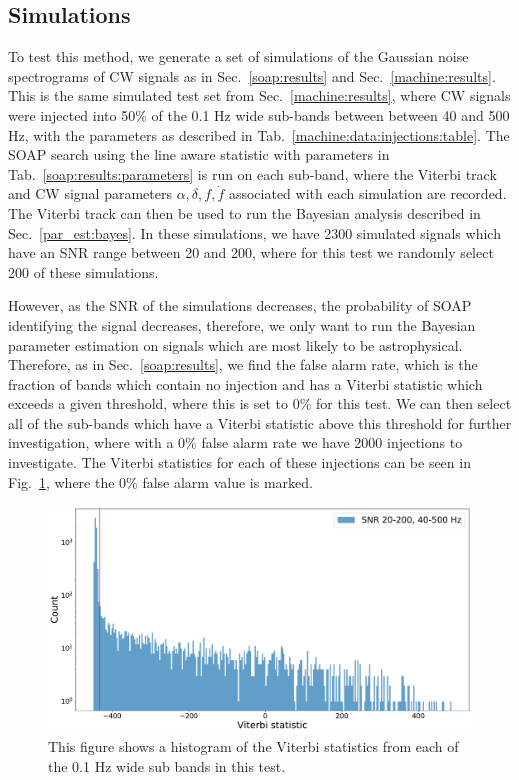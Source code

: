 \subsection{\label{par_est:results:simulations}Simulations}
%
%
To test this method, we generate a set of simulations of the Gaussian noise spectrograms of \gls{CW} signals as in Sec.~\ref{soap:results} and Sec.~\ref{machine:results}.
This is the same simulated test set from Sec.~\ref{machine:results}, where \gls{CW} signals were injected into 50\% of the 0.1 Hz wide sub-bands between between 40 and 500 Hz, with the parameters as described in Tab.~\ref{machine:data:injections:table}. 
The SOAP search using the line aware statistic with parameters in Tab.~\ref{soap:results:parameters}  is run on each sub-band, where the Viterbi track and \gls{CW} signal parameters $\alpha, \delta, f, \dot{f}$ associated with each simulation are recorded.
The Viterbi track can then be used to run the Bayesian analysis described in Sec.~\ref{par_est:bayes}.
In these simulations, we have 2300 simulated signals which have an \gls{SNR} range between 20 and 200, where for this test we randomly select 200 of these simulations.

\if
However, as the \gls{SNR} of the simulations decreases, the probability of SOAP identifying the signal decreases, therefore, we only want to run the Bayesian parameter estimation on signals which are most likely to be astrophysical.
Therefore, as in Sec.~\ref{soap:results}, we find the false alarm rate, which is the fraction of bands which contain no injection and has a Viterbi statistic which exceeds a given threshold, where this is set to 0\% for this test.
We can then select all of the sub-bands which have a Viterbi statistic above this threshold for further investigation, where with a 0\% false alarm rate we have 2000  injections to investigate.
The Viterbi statistics for each of these injections can be seen in Fig.~\ref{par_est:results:all_viterbi}, where the 0\% false alarm value is marked.
%
\begin{figure}
    \centering
    \includegraphics[width=\linewidth]{C5_parameter/viterbi_hist.pdf}
    \caption[All Viterbi statistics]{This figure shows a histogram of the Viterbi statistics from each of the 0.1 Hz wide sub bands in this test. }
    \label{par_est:results:all_viterbi}
\end{figure}
\fi


